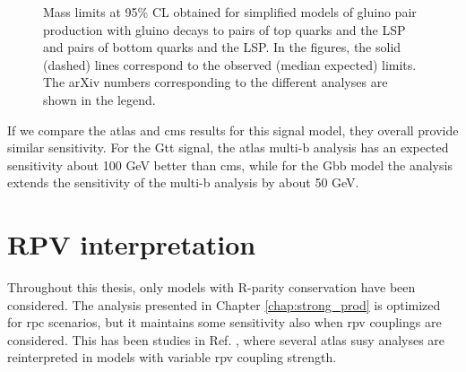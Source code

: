 \begin{figure}[htbp]
	\centering 
	\caption{Mass limits at 95\% CL obtained for simplified models of gluino pair production 
	with gluino decays to  pairs of top quarks and the LSP and 
	pairs of bottom quarks and the LSP. 
	In the figures, the solid (dashed) 
	lines correspond to the observed (median expected) limits. The arXiv numbers corresponding to the different analyses are shown in the legend.
	}
	\label{fig:limits_GbbGtt_comp}
\end{figure}

If we compare the \gls{atlas} and \gls{cms} results for this signal model, 
they overall provide similar sensitivity. 
For the Gtt signal, the \gls{atlas} multi-b analysis has an expected sensitivity about 100 GeV better than \gls{cms}, while 
for the Gbb model the \htmiss analysis extends the sensitivity of the multi-b analysis by about 50 GeV.

\FloatBarrier

\section{RPV interpretation}

Throughout this thesis, only models with R-parity conservation have been considered. 
The analysis presented in Chapter \ref{chap:strong_prod} is optimized for 
\gls{rpc} scenarios, but it maintains some sensitivity also when \gls{rpv} couplings are considered. 
This has been studies in Ref. \cite{ATLAS-CONF-2018-003}, where several \gls{atlas} \gls{susy} analyses 
are reinterpreted in models with variable \gls{rpv} coupling strength.

